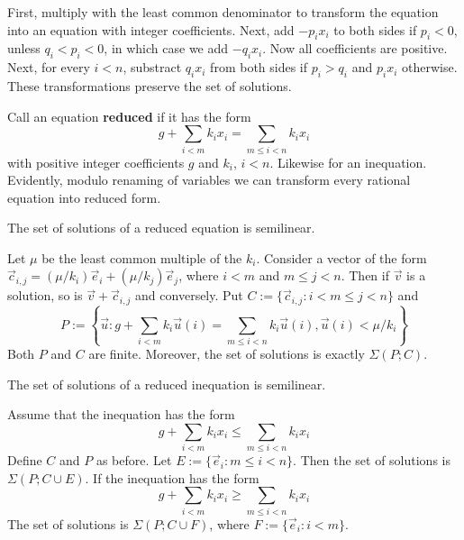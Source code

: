 \proofbeg
First, multiply with the least common denominator to transform the 
equation into an equation with integer coefficients. Next, add 
$-p_ix_i$ to both sides if $p_i < 0$, unless $q_i < p_i < 0$, in 
which case we add $- q_i x_i$. Now all coefficients are positive. 
Next, for every $i < n$, substract $q_i x_i$ from both sides if 
$p_i > q_i$ and $p_i x_i$ otherwise. These transformations preserve 
the set of solutions.
\proofend

Call an equation \textbf{reduced} if it has the form 
\begin{equation}
g + \sum_{i < m} k_i x_i = \sum_{m \leq i < n} k_i x_i
\end{equation}
with positive integer coefficients $g$ and $k_i$, $i < n$. 
Likewise for an inequation. Evidently, modulo renaming of 
variables we can transform every rational equation into 
reduced form.
\begin{lem}
\label{lem:eq}
The set of solutions of a reduced equation is semilinear.
\end{lem}
\proofbeg
Let $\mu$ be the least common multiple of the $k_i$. 
Consider a vector of the form $\vec{c}_{i,j} = (\mu/k_i)\vec{e}_i + 
(\mu/k_j)\vec{e}_j$, where $i < m$ and $m \leq j < n$. Then 
if $\vec{v}$ is a solution, so is $\vec{v} + \vec{c}_{i,j}$ and conversely. 
Put $C := \{\vec{c}_{i,j} : i < m \leq j < n\}$ and 
\begin{equation}
P := \left\{\vec{u} : g + \sum_{i < m} k_i \vec{u}(i) = \sum_{m \leq i 
< n} k_i \vec{u}(i), \vec{u}(i) < \mu/k_i\right\}
\end{equation}
Both $P$ and $C$ are finite. Moreover, the set of solutions is 
exactly $\Sigma(P;C)$. 
\proofend
\begin{lem}
\label{lem:ineq}
The set of solutions of a reduced inequation is semilinear.
\end{lem}
\proofbeg
Assume that the inequation has the form
\begin{equation}
g + \sum_{i < m} k_i x_i \leq \sum_{m \leq i < n} k_i x_i
\end{equation}
Define $C$ and $P$ as before. Let $E := \{\vec{e}_i : m \leq i < n\}$.
Then the set of solutions is $\Sigma(P;C \cup E)$. If the inequation 
has the form
\begin{equation}
g + \sum_{i < m} k_i x_i \geq \sum_{m \leq i < n} k_i x_i
\end{equation}
The set of solutions is $\Sigma(P;C \cup F)$, where 
$F := \{\vec{e}_i : i < m\}$.
